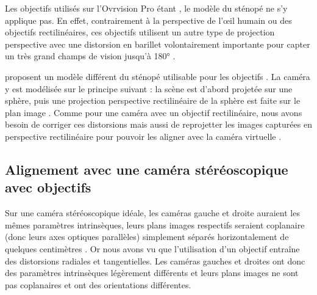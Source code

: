 Les objectifs utilisés sur l'Ovrvision Pro étant , le modèle du sténopé ne s'y applique pas. En effet, contrairement à la perspective de l'\oe il humain ou des objectifs rectilinéaires, ces objectifs utilisent un autre type de projection perspective avec une distorsion en barillet volontairement importante pour capter un très grand champs de vision jusqu'à \ang{180} .


\cite{Mei2007} proposent un modèle différent du sténopé utilisable pour les objectifs . La caméra y est modélisée sur le principe suivant : la scène est d'abord projetée sur une sphère, puis une projection perspective rectilinéaire de la sphère est faite sur le plan image . Comme pour une caméra avec un objectif rectilinéaire, nous avons besoin de corriger ces distorsions mais aussi de reprojetter les images capturées en perspective rectilinéaire pour pouvoir les aligner avec la caméra virtuelle .


\subsection{Alignement avec une caméra stéréoscopique avec objectifs }
\label{subsec:stereo_camera_calibration}

Sur une caméra stéréoscopique idéale, les caméras gauche et droite auraient les mêmes paramètres intrinsèques, leurs plans images respectifs seraient coplanaire (donc leurs axes optiques parallèles) simplement séparés horizontalement de quelques centimètres . Or nous avons vu que l'utilisation d'un objectif entraîne des distorsions radiales et tangentielles. Les caméras gauches et droites ont donc des paramètres intrinsèques légèrement différents et leurs plans images ne sont pas coplanaires et ont des orientations différentes.

